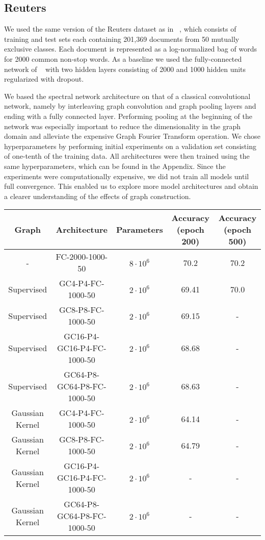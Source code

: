 \subsection{Reuters}

We used the same version of the Reuters dataset as in ~\cite{Hinton2012}, which consists of training and test sets each containing 201,369 documents from 50 mutually exclusive classes. Each document is represented as a log-normalized bag of words for 2000 common non-stop words. As a baseline we used the fully-connected network of ~\cite{Hinton2012} with two hidden layers consisting of 2000 and 1000 hidden units regularized with dropout.  

We based the spectral network architecture on that of a classical convolutional network, namely by interleaving graph convolution and graph pooling layers and ending with a fully connected layer. Performing pooling at the beginning of the network was especially important to reduce the dimensionality in the graph domain and alleviate the expensive Graph Fourier Transform operation.  We chose hyperparameters by performing initial experiments on a validation set consisting of one-tenth of the training data. All architectures were then trained using the same hyperparameters, which can be found in the Appendix. 
Since the experiments were computationally expensive, we did not train all models until full convergence. This enabled us to explore more model architectures and obtain a clearer understanding of the effects of graph construction.  

\begin{center}
 
\begin{tabular}{|c|c|c|c|c|}
\hline
Graph & Architecture & Parameters & Accuracy (epoch 200) & Accuracy (epoch 500)\\
\hline
- &FC-2000-1000-50 & $8 \cdot 10^6$ & 70.2 & 70.2 \\
Supervised & GC4-P4-FC-1000-50 & $2\cdot 10^6$ & 69.41 & 70.0 \\
Supervised & GC8-P8-FC-1000-50 & $2 \cdot 10^6$ & 69.15 & - \\
Supervised & GC16-P4-GC16-P4-FC-1000-50 & $2 \cdot 10^6$ & 68.68 & - \\
Supervised &GC64-P8-GC64-P8-FC-1000-50 & $2 \cdot 10^6$ & 68.63 & - \\
Gaussian Kernel & GC4-P4-FC-1000-50 & $2\cdot 10^6$ & 64.14 & - \\
Gaussian Kernel & GC8-P8-FC-1000-50 & $2 \cdot 10^6$ & 64.79 & - \\
Gaussian Kernel & GC16-P4-GC16-P4-FC-1000-50 & $2 \cdot 10^6$ & - & - \\
Gaussian Kernel & GC64-P8-GC64-P8-FC-1000-50 & $2 \cdot 10^6$ & - & - \\
\hline
\end{tabular}
\end{center}


